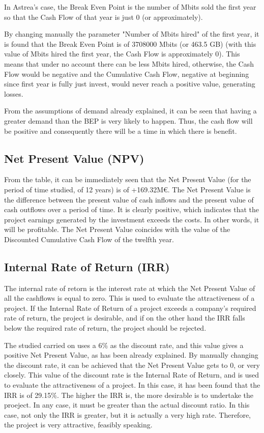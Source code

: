 In Astrea's case, the Break Even Point is the number of Mbits sold the first year so that the Cash Flow of that year is just 0 (or approximately). 

By changing manually the parameter "Number of Mbits hired" of the first year, it is found that the Break Even Point is of 3708000 Mbits (or 463.5 GB) (with this value of Mbits hired the first year, the Cash Flow is approximately 0). This means that under no account there can be less Mbits hired, otherwise, the Cash Flow would be negative and the Cumulative Cash Flow, negative at beginning since first year is fully just invest, would never reach a positive value, generating losses. 

From the assumptions of demand already explained, it can be seen that having a greater demand than the BEP is very likely to happen. Thus, the cash flow will be positive and consequently there will be a time in which there is benefit.

\subsection{Net Present Value (NPV)}
From the table, it can be immediately seen that the Net Present Value (for the period of time studied, of 12 years) is of +169.32M\euro. The Net Present Value is the difference between the present value of cash inflows and the present value of cash outflows over a period of time. It is clearly positive, which indicates that the project earnings generated by the investment exceeds the costs. In other words, it will be profitable. The Net Present Value coincides with the value of the Discounted Cumulative Cash Flow of the twelfth year. 

\subsection{Internal Rate of Return (IRR)}
The internal rate of retorn is the interest rate at which the Net Present Value of all the cashflows is equal to zero. This is used to evaluate the attractiveness of a project. If the Internal Rate of Return of a project exceeds a company's required rate of return, the project is desirable, and if on the other hand the IRR falls below the required rate of return, the project should be rejected.

The studied carried on uses a 6\% as the discount rate, and this value gives a positive Net Present Value, as has been already explained. By manually changing the discount rate, it can be achieved that the Net Present Value gets to 0, or very closely. This value of the discount rate is the Internal Rate of Return, and is used to evaluate the attractiveness of a project. In this case, it has been found that the IRR is of 29.15\%. The higher the IRR is, the more desirable is to undertake the proeject. In any case, it must be greater than the actual discount ratio. In this case, not only the IRR is greater, but it is actually a very high rate. Therefore, the project is very attractive, feasibly speaking. 

